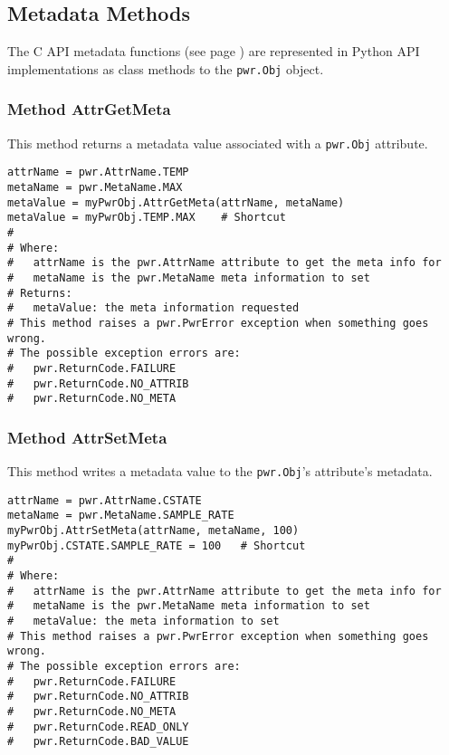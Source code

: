 \documentclass[12pt]{report} %
\begin{document}
\begin{appendices}
\subsection{Metadata Methods} \label{sec:PythonMetadataMethods}
The C API metadata functions (see page \pageref{sec:METADATA}) are represented
in Python API implementations as class methods to the \texttt{pwr.Obj}
object.

\subsubsection{Method AttrGetMeta} \label{meth:AttrGetMeta}

This method returns a metadata value associated with a \texttt{pwr.Obj} attribute.
\begin{center}\begin{minipage}{.95\linewidth}\begin{lstlisting}
attrName = pwr.AttrName.TEMP
metaName = pwr.MetaName.MAX
metaValue = myPwrObj.AttrGetMeta(attrName, metaName)
metaValue = myPwrObj.TEMP.MAX    # Shortcut
#
# Where:
#   attrName is the pwr.AttrName attribute to get the meta info for
#   metaName is the pwr.MetaName meta information to set
# Returns:
#   metaValue: the meta information requested
# This method raises a pwr.PwrError exception when something goes wrong.
# The possible exception errors are:
#   pwr.ReturnCode.FAILURE
#   pwr.ReturnCode.NO_ATTRIB
#   pwr.ReturnCode.NO_META
\end{lstlisting}\end{minipage}\end{center}

\subsubsection{Method AttrSetMeta} \label{meth:AttrSetMeta}

This method writes a metadata value to the \texttt{pwr.Obj}'s attribute's metadata.
\begin{center}\begin{minipage}{.95\linewidth}\begin{lstlisting}
attrName = pwr.AttrName.CSTATE
metaName = pwr.MetaName.SAMPLE_RATE
myPwrObj.AttrSetMeta(attrName, metaName, 100)
myPwrObj.CSTATE.SAMPLE_RATE = 100   # Shortcut
#
# Where:
#   attrName is the pwr.AttrName attribute to get the meta info for
#   metaName is the pwr.MetaName meta information to set
#   metaValue: the meta information to set
# This method raises a pwr.PwrError exception when something goes wrong.
# The possible exception errors are:
#   pwr.ReturnCode.FAILURE
#   pwr.ReturnCode.NO_ATTRIB
#   pwr.ReturnCode.NO_META
#   pwr.ReturnCode.READ_ONLY
#   pwr.ReturnCode.BAD_VALUE
\end{lstlisting}\end{minipage}\end{center}


\end{appendices}
\end{document}
